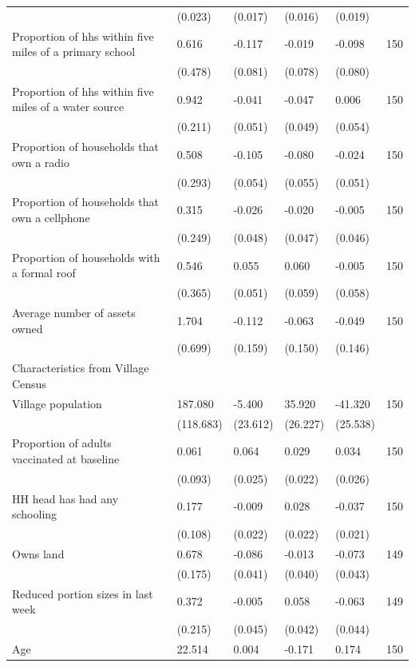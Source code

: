 \begin{tabular}{llllll}
 & (0.023) & (0.017) & (0.016) & (0.019) & \\
Proportion of hhs within five miles of a primary school & 0.616 & -0.117 & -0.019 & -0.098 & 150\\
 & (0.478) & (0.081) & (0.078) & (0.080) & \\
\addlinespace
Proportion of hhs within five miles of a water source & 0.942 & -0.041 & -0.047 & 0.006 & 150\\
 & (0.211) & (0.051) & (0.049) & (0.054) & \\
Proportion of households that own a radio & 0.508 & -0.105 & -0.080 & -0.024 & 150\\
 & (0.293) & (0.054) & (0.055) & (0.051) & \\
Proportion of households that own a cellphone & 0.315 & -0.026 & -0.020 & -0.005 & 150\\
\addlinespace
 & (0.249) & (0.048) & (0.047) & (0.046) & \\
Proportion of households with a formal roof & 0.546 & 0.055 & 0.060 & -0.005 & 150\\
 & (0.365) & (0.051) & (0.059) & (0.058) & \\
Average number of assets owned & 1.704 & -0.112 & -0.063 & -0.049 & 150\\
 & (0.699) & (0.159) & (0.150) & (0.146) & \\
\addlinespace
Characteristics from Village Census &  &  &  &  & \\
Village population & 187.080 & -5.400 & 35.920 & -41.320 & 150\\
 & (118.683) & (23.612) & (26.227) & (25.538) & \\
Proportion of adults vaccinated at baseline & 0.061 & 0.064 & 0.029 & 0.034 & 150\\
 & (0.093) & (0.025) & (0.022) & (0.026) & \\
\addlinespace
HH head has had any schooling & 0.177 & -0.009 & 0.028 & -0.037 & 150\\
 & (0.108) & (0.022) & (0.022) & (0.021) & \\
Owns land & 0.678 & -0.086 & -0.013 & -0.073 & 149\\
 & (0.175) & (0.041) & (0.040) & (0.043) & \\
Reduced portion sizes in last week & 0.372 & -0.005 & 0.058 & -0.063 & 149\\
\addlinespace
 & (0.215) & (0.045) & (0.042) & (0.044) & \\
Age & 22.514 & 0.004 & -0.171 & 0.174 & 150\\

\end{tabular}
